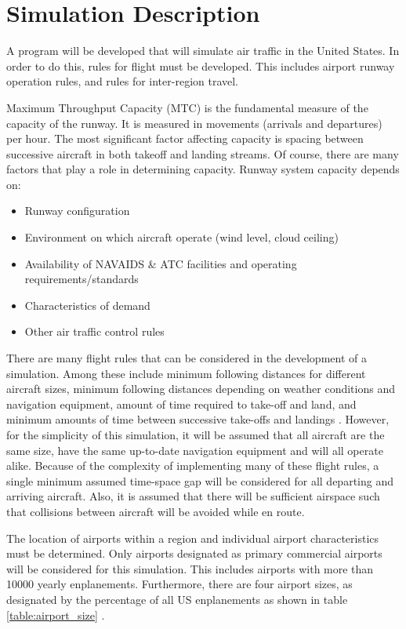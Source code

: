 \section {Simulation Description}

A program will be developed that will simulate air traffic in the United States. In order to do this,
rules for flight must be developed. This includes airport runway operation rules, and rules for
inter-region travel.

Maximum Throughput Capacity (MTC) is the fundamental measure of the capacity of the
runway. It is measured in movements (arrivals and departures) per hour. The most significant
factor affecting capacity is spacing between successive aircraft in both takeoff and landing
streams. Of course, there are many factors that play a role in determining capacity. Runway
system capacity depends on:


\begin{itemize}
\renewcommand{\labelitemi}{$\bullet$}
\item Runway configuration
\item Environment on which aircraft operate (wind level, cloud ceiling)
\item Availability of NAVAIDS \& ATC facilities and operating requirements/standards
\item Characteristics of demand
\item Other air traffic control rules
\end{itemize}

There are many flight rules that can be considered in the development of a simulation. Among
these include minimum following distances for different aircraft sizes, minimum following
distances depending on weather conditions and navigation equipment, amount of time required
to take-off and land, and minimum amounts of time between successive take-offs and landings \cite{fed1}.
However, for the simplicity of this simulation, it will be assumed that all aircraft are the same
size, have the same up-to-date navigation equipment and will all operate alike. Because of the
complexity of implementing many of these flight rules, a single minimum assumed time-space
gap will be considered for all departing and arriving aircraft. Also, it is assumed that there will be
sufficient airspace such that collisions between aircraft will be avoided while en route.

The location of airports within a region and individual airport characteristics must be determined.
Only airports designated as primary commercial airports will be considered for this simulation.
This includes airports with more than 10000 yearly enplanements. Furthermore, there are four
airport sizes, as designated by the percentage of all US enplanements as shown in table \ref{table:airport_size} \cite{fed2}.

